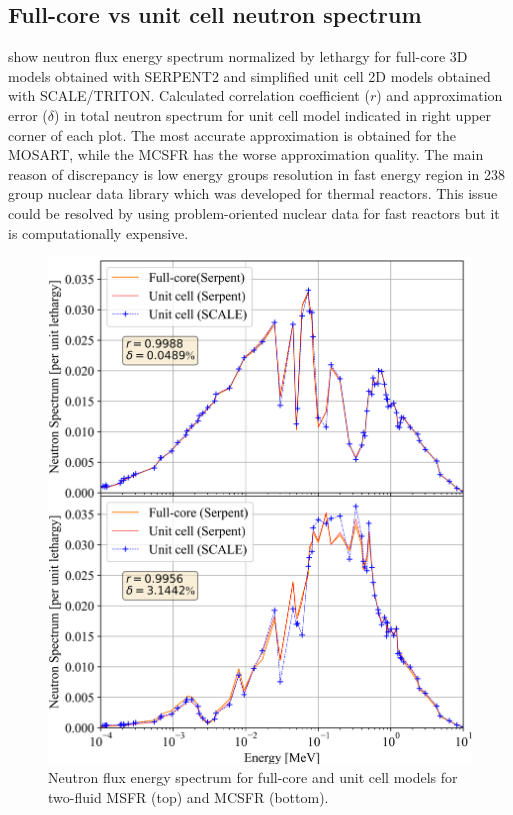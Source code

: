 \documentclass{anstrans}
\begin{document}
\subsection{Full-core vs unit cell neutron spectrum} 
\label{sec:spectrum}
 show neutron flux energy spectrum normalized by lethargy for full-core 3D models obtained with SERPENT2 and simplified unit cell 2D models obtained with SCALE/TRITON. Calculated correlation coefficient ($r$) and approximation error ($\delta$) in total neutron spectrum for unit cell model indicated in right upper corner of each plot. The most accurate approximation is obtained for the \gls{MOSART}, while the \gls{MCSFR} has the worse approximation quality. The main reason of discrepancy is low energy groups resolution in fast energy region in 238 group nuclear data library which was developed for thermal reactors. This issue could be resolved by using problem-oriented nuclear data for fast reactors but it is computationally expensive. 
\begin{figure}[!htb]
  \centering
  \includegraphics[scale=0.545]{./Figures/two_full_vs_unit_spectrum.png}
      \vspace{-0.2in}
  \caption{Neutron flux energy spectrum for full-core and unit cell models for two-fluid \gls{MSFR} (top) and \gls{MCSFR} (bottom).}   
    \vspace{-0.1in}
  \label{fig:spectrum_two}
\end{figure}
\end{document}
